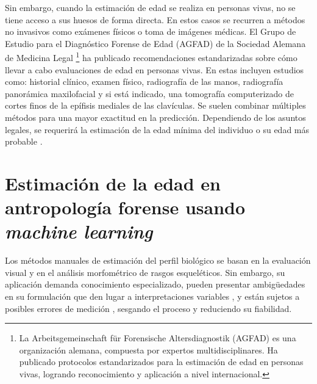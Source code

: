 Sin embargo, cuando la estimación de edad se realiza en personas vivas, no se tiene acceso a sus huesos de 
forma directa.
En estos casos se recurren a métodos no invasivos como exámenes físicos o toma de imágenes médicas.
El Grupo de Estudio para el Diagnóstico Forense de Edad (AGFAD) de la Sociedad Alemana de Medicina Legal
\footnote{
    La Arbeitsgemeinschaft für Forensische Altersdiagnostik (AGFAD) es una organización alemana, compuesta 
    por expertos multidisciplinares. Ha publicado protocolos estandarizados para la estimación de edad en 
    personas vivas, logrando reconocimiento y aplicación a nivel internacional.
} 
ha publicado recomendaciones estandarizadas sobre cómo llevar a cabo evaluaciones de edad en personas vivas. 
En estas incluyen estudios como: historial clínico, examen físico, radiografía de las manos, radiografía 
panorámica maxilofacial y si está indicado, una tomografía computerizado de cortes finos de la epífisis 
mediales de las clavículas. Se suelen combinar múltiples métodos para una mayor exactitud en la predicción. 
Dependiendo de los asuntos legales, se requerirá la estimación de la edad mínima del individuo o su edad más 
probable \cite{schmeling2016}. 





\section{Estimación de la edad en antropología forense usando \textit{machine learning}}

Los métodos manuales de estimación del perfil biológico se basan en la evaluación visual y en el análisis 
morfométrico de rasgos esqueléticos. Sin embargo, su aplicación demanda conocimiento especializado, pueden 
presentar ambigüedades en su formulación que den lugar a interpretaciones variables \cite{berst2001}, y están 
sujetos a posibles errores de medición \cite{langley2018}, sesgando el proceso y reduciendo su fiabilidad.


